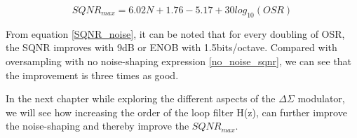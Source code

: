 \begin{equation}\label{SQNR_noise}
  SQNR_{max} = 6.02N + 1.76 - 5.17 + 30log_{10}(OSR)  
\end{equation}

From equation \ref{SQNR_noise}, it can be noted that for every doubling of OSR, the SQNR improves with 9dB or ENOB with 1.5bits/octave. Compared with oversampling with no noise-shaping expression \ref{no_noise_sqnr}, we can see that the improvement is three times as good. 

In the next chapter while exploring the different aspects of the $\Delta\Sigma$ modulator, we will see how increasing the order of the loop filter H(z), can further improve the noise-shaping and thereby improve the $SQNR_{max}$. 